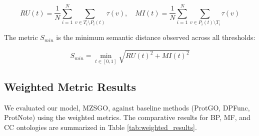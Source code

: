 \documentclass{article}
\begin{document}
\begin{equation}
    RU(t) = \frac{1}{N} \sum_{i=1}^{N} \sum_{v \in T_i \setminus P_i(t)} \tau(v), \quad MI(t) = \frac{1}{N} \sum_{i=1}^{N} \sum_{v \in P_i(t) \setminus T_i} \tau(v)
\end{equation}

The metric $S_{min}$ is the minimum semantic distance observed across all thresholds:

\begin{equation}
    S_{min} = \min_{t \in [0, 1]} \sqrt{RU(t)^2 + MI(t)^2}
\end{equation}

\subsection{Weighted Metric Results}

We evaluated our model, MZSGO, against baseline methods (ProtGO, DPFunc, ProtNote) using the weighted metrics. The comparative results for BP, MF, and CC ontologies are summarized in Table \ref{tab:weighted_results}.

\begin{table}[h]
\centering
\caption{Performance comparison using weighted metrics ($wF_{max}$, $wAUPR$, and $S_{min}$) across three GO ontologies (BP, MF, CC). All values are reported to 4 decimal places. Best results are highlighted in bold. Note that for $S_{min}$, lower values indicate better performance.}
\label{tab:weighted_results}
\end{table}
\end{document}
